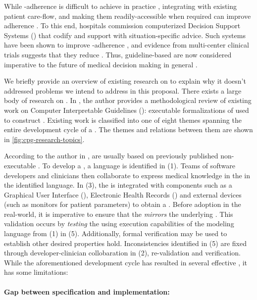 While \BPG{}-adherence is difficult to achieve in
practice \cite{RandJAMA99,DavisCMAJ97},
integrating \BPGs{} with existing patient care-flow,
and making them readily-accessible when required can improve adherence \cite{WoolfBMJ99}.
To this end, hospitals commission computerized Decision Support Systems (\CDSSs{})
that codify \BPGs{} and support \HCPs{} with situation-specific advice.
Such systems have been shown to improve \BPG{}-adherence \cite{GargJAMA06,KawamotoBMJ05}, and evidence from multi-center clinical trials
suggests that they reduce \PMEs{} \cite{BenettJAMIA16,SahotaJIS11}.
Thus, guideline-based \CDSSs{} are now considered imperative to the
future of medical decision making in general \cite{JamesNEJM01}.

We briefly provide an overview of existing research on \CDSSs{} to explain why
it doesn't addressed problems we intend to address in this proposal.
There exists a large body of research on \CDSSs{}. In
\cite{PelegJBI13}, the author provides a methodological review of
existing work on Computer Interpretable Guidelines (\CIGs{}): executable
formalizations of \BPGs{} used to construct \CDSSs{}.
Existing work is classified into one of eight themes spanning
the entire development cycle of a \CIG{}. The themes and relations between them
are shown in \figurename{} \ref{fig:cpg-research-topics}.

According to the author in \cite{PelegJBI13}, \CIGs{} are usually based on previously published non-executable
\BPGs{}. To develop a \CIG{}, a language is identified in (1). Teams of
software developers and clinicians then collaborate to express medical knowledge
in the \BPG{} in the identified language. In (3), the \CIG{}
is integrated with components such as a Graphical User
Interface (\GUI{}), Electronic Health Records (\EHRs{}) and external devices
(such as monitors for patient parameters) to obtain a \CDSS. Before adoption
in the real-world, it is imperative to ensure that the \CIG{} \emph{mirrors}
the underlying \BPG{}. This validation occurs by \emph{testing} the \CDSS{}
using execution capabilities of the modeling language from (1) in (5).
Additionally, formal verification may be used to establish other desired
properties hold. Inconsistencies identified in (5) are fixed through developer-clinician
collobaration in (2),  re-validation and
verification. While the aforementioned development cycle has resulted in several
effective \CDSSs{}, it has some limitations:

\paragraph{Gap between specification and implementation:}

